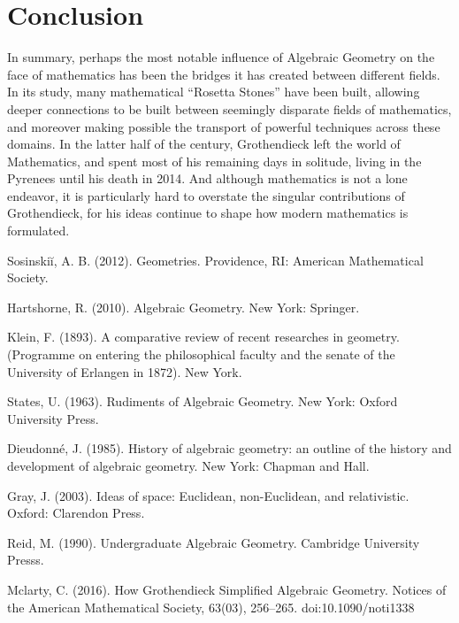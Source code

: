 \documentclass{article}
\theoremstyle{definition}
\begin{document}
\section{Conclusion}

In summary, perhaps the most notable influence of Algebraic Geometry on
the face of mathematics has been the bridges it has created between
different fields. In its study, many mathematical ``Rosetta Stones'' have
been built, allowing deeper connections to be built between seemingly disparate
fields of mathematics, and moreover making possible the transport of
powerful techniques across these domains. In the latter half
of the  century, Grothendieck left the world of Mathematics,
and spent most of his remaining days in solitude, living in the Pyrenees until his death in 2014. And although mathematics is not a lone
endeavor, it is particularly hard to overstate the singular
contributions of Grothendieck, for his ideas continue to shape how modern mathematics is formulated.

\newpage

\begin{thebibliography}{20}

Sosinskiĭ, A. B. (2012). Geometries. Providence, RI: American Mathematical Society.

Hartshorne, R. (2010). Algebraic Geometry. New York: Springer.

Klein, F. (1893). A comparative review of recent researches in geometry. (Programme on entering the philosophical faculty and the senate of the University of Erlangen in 1872). New York.

States, U. (1963). Rudiments of Algebraic Geometry. New York: Oxford University Press.

Dieudonné, J. (1985). History of algebraic geometry: an outline of the history and development of algebraic geometry. New York: Chapman and Hall.

Gray, J. (2003). Ideas of space: Euclidean, non-Euclidean, and relativistic. Oxford: Clarendon Press.

Reid, M. (1990). Undergraduate Algebraic Geometry. Cambridge University Presss.

Mclarty, C. (2016). How Grothendieck Simplified Algebraic Geometry. Notices of the American Mathematical Society, 63(03), 256–265. doi:10.1090/noti1338

\end{thebibliography}
\end{document}
